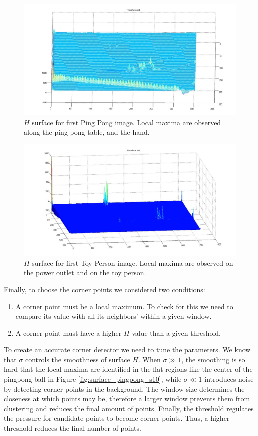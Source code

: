 \documentclass[11pt]{article}
\begin{document}
\begin{figure}[H] \centering
	\includegraphics[width=.8\textwidth]{imgs/surface_pingpong.jpg}
	\caption{$H$ surface for first Ping Pong image. Local maxima are
		observed along the ping pong table, and the hand.}
	\label{fig:surface_pingpong}
\end{figure}

\begin{figure}[H] \centering
	\includegraphics[width=.8\textwidth]{imgs/surface_person.jpg}
	\caption{$H$ surface for first Toy Person image. Local maxima are
		observed on the power outlet and on the toy person.}
	\label{fig:surface_person}
\end{figure}

Finally, to choose the corner points we considered two conditions:
\begin{enumerate} 
	\item A corner point must be a local maximum. To check for
		this we need to compare its value with all its neighbors' within
		a given window.
	\item A corner point must have a higher $H$
		value than a given threshold.
\end{enumerate}

To create an accurate corner detector we need to tune the parameters. We know
that $\sigma$ controls the smoothness of surface $H$. When $\sigma \gg 1$, the
smoothing is so hard that the local maxima are identified in the flat regions
like the center of the pingpong ball in Figure \ref{fig:surface_pingpong_s10}, while
$\sigma \ll 1$ introduces noise by detecting corner points in the background. The
window size determines the closeness at which points may be, therefore a larger
window prevents them from clustering and reduces the final amount of points.
Finally, the threshold regulates the pressure for candidate points to become
corner points. Thus, a higher threshold reduces the final number of points.
\end{document}
